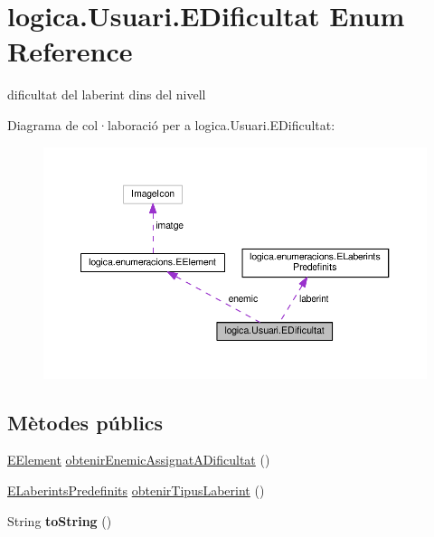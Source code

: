 \hypertarget{enumlogica_1_1_usuari_1_1_e_dificultat}{\section{logica.\+Usuari.\+E\+Dificultat Enum Reference}
\label{enumlogica_1_1_usuari_1_1_e_dificultat}
}


dificultat del laberint dins del nivell  




Diagrama de col·laboració per a logica.\+Usuari.\+E\+Dificultat\+:
\nopagebreak
\begin{figure}[H]
\begin{center}
\leavevmode
\includegraphics[width=350pt]{enumlogica_1_1_usuari_1_1_e_dificultat__coll__graph}
\end{center}
\end{figure}
\subsection*{Mètodes públics}
\begin{DoxyCompactItemize}
\item 
\hyperlink{enumlogica_1_1enumeracions_1_1_e_element}{E\+Element} \hyperlink{enumlogica_1_1_usuari_1_1_e_dificultat_a87d1ece33da92fcdc158fd345ec1abec}{obtenir\+Enemic\+Assignat\+A\+Dificultat} ()
\item 
\hyperlink{enumlogica_1_1enumeracions_1_1_e_laberints_predefinits}{E\+Laberints\+Predefinits} \hyperlink{enumlogica_1_1_usuari_1_1_e_dificultat_a3ad356db806867006a88aacfea50d85a}{obtenir\+Tipus\+Laberint} ()
\item 
\hypertarget{enumlogica_1_1_usuari_1_1_e_dificultat_aa9d3029f8de838486bdca09757c5111a}{String {\bfseries to\+String} ()}\label{enumlogica_1_1_usuari_1_1_e_dificultat_aa9d3029f8de838486bdca09757c5111a}

\end{DoxyCompactItemize}

